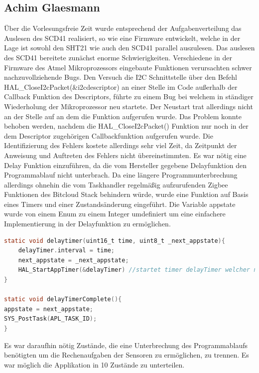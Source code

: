 \documentclass[]{article}
\begin{document}
\subsection{Achim Glaesmann}
Über die Vorlesungsfreie Zeit wurde entsprechend der Aufgabenverteilung das Auslesen des SCD41 realisiert, so wie eine Firmware entwickelt, welche in der Lage ist sowohl den SHT21 wie auch den SCD41 parallel auszulesen. Das auslesen des SCD41 bereitete zunächst enorme Schwierigkeiten. Verschiedene in der Firmware des Atmel Mikroprozessors eingebaute Funktionen verursachten schwer nachzuvollziehende Bugs. Den Versuch die I2C Schnittstelle über den Befehl HAL\_CloseI2cPacket(\&i2cdescriptor) an einer Stelle im Code außerhalb der Callback Funktion des Descriptors, führte zu einem Bug bei welchem in ständiger Wiederholung der Mikroprozessor neu startete. Der Neustart trat allerdings nicht an der Stelle auf an dem die Funktion aufgerufen wurde. Das Problem konnte behoben werden, nachdem die HAL\_CloseI2cPacket() Funktion nur noch in der dem Descriptor zugehörigen Callbackfunktion aufgerufen wurde. Die Identifizierung des Fehlers kostete allerdings sehr viel Zeit, da Zeitpunkt der Anweisung und Auftreten des Fehlers nicht übereinstimmten.
Es war nötig eine Delay Funktion einzuführen, da die vom Hersteller gegebene Delayfunktion den Programmablauf nicht unterbrach. Da eine längere Programmunterbrechung allerdings ohnehin die vom Taskhandler regelmäßig aufzurufenden Zigbee Funktionen des Bitcloud Stack behindern würde, wurde eine Funktion auf Basis eines Timers und einer Zustandsänderung eingeführt. Die Variable appstate wurde von einem Enum zu einem Integer umdefiniert um eine einfachere Implementierung in der Delayfunktion zu ermöglichen. 

\begin{lstlisting}[language=C,frame=single, caption = Delay Timer, label = delay_timer] 
static void delaytimer(uint16_t time, uint8_t _next_appstate){
	delayTimer.interval = time;
	next_appstate = _next_appstate;
	HAL_StartAppTimer(&delayTimer) //startet timer delayTimer welcher nach der angegebenen Zeit in ms die Funktion delayTimerComplete(); aufruft
}

static void delayTimerComplete(){
appstate = next_appstate;
SYS_PostTask(APL_TASK_ID); 
}

\end{lstlisting} 

Es war daraufhin nötig Zustände, die eine Unterbrechung des Programmablaufs benötigten um die Rechenaufgaben der Sensoren zu ermöglichen, zu trennen. Es war möglich die Applikation in 10 Zustände zu unterteilen.
\end{document}

